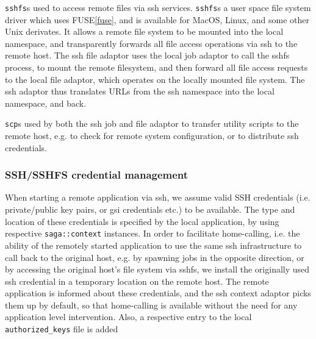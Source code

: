 \documentclass[conference,final]{IEEEtran}
\newcommand{\upp}{\vspace*{-0.5em}}
\newcommand{\T}[1]{\texttt{#1}}
\newcommand{\scp}[1]{\texttt{scp}}
\newcommand{\sshfs}[1]{\texttt{sshfs}}
\begin{document}
\sshfs is used to access remote files via ssh services.  \sshfs is a
user space file system driver which uses FUSE\ref{fuse}, and is
available for MacOS, Linux, and some other Unix derivates.  It allows
a remote file system to be mounted into the local namespace, and
transparently forwards all file access operations via ssh to the
remote host.  The ssh file adaptor uses the local job adaptor to call
the sshfs process, to mount the remote filesystem, and then forward
all file access requests to the local file adaptor, which operates on
the locally mounted file system.  The ssh adaptor thus translates URLs
from the ssh namespace into the local namespace, and back.

\scp is used by both the ssh job and file adaptor to transfer utility
scripts to the remote host, e.g. to check for remote system
configuration, or to distribute ssh credentials.

\subsubsection{SSH/SSHFS credential management}

When starting a remote application via ssh, we assume valid SSH
credentials (i.e. private/public key pairs, or gsi credentials etc.)
to be available.  The type and location of these credentials is
specified by the local application, by using respective
\T{saga::context} instances.  In order to facilitate home-calling,
i.e. the ability of the remotely started application to use the same
ssh infrastructure to call back to the original host, e.g. by spawning
jobs in the opposite direction, or by accessing the original host's
file system via sshfs, we install the originally used ssh credential
in a temporary location on the remote host. The remote application is
informed about these credentials, and the ssh context adaptor picks
them up by default, so that home-calling is available without the need
for any application level intervention.  Also, a respective entry to
the local \T{authorized\_keys} file is added%

\end{document}
